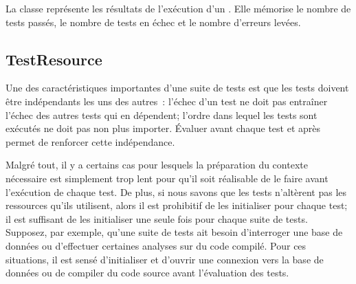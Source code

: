 \documentclass[a4paper,10pt,twoside]{book}
\begin{document}
La classe  représente les résultats de l'exécution d'un . Elle mémorise le nombre de tests passés, le nombre de tests en échec et le nombre d'erreurs levées.

\subsection{TestResource}
\label{sec:resource}

Une des caractéristiques importantes d'une suite de tests est que les tests doivent être indépendants les uns des autres~: l'échec d'un test ne doit pas entraîner l'échec des autres tests qui en dépendent; l'ordre dans lequel les tests sont exécutés ne doit pas non plus importer.
\'Evaluer   avant chaque test et  après permet de renforcer cette indépendance.

Malgré tout, il y a certains cas pour lesquels la préparation du contexte nécessaire est simplement trop lent pour qu'il soit 
réalisable
de le faire avant l'exécution de chaque test. De plus, si nous savons que les tests n'altèrent pas les ressources qu'ils utilisent, alors il est prohibitif de les initialiser pour chaque test; il est suffisant de les initialiser une seule fois pour chaque suite de tests. Supposez, par exemple, qu'une suite de tests ait besoin d'interroger une base de données ou d'effectuer certaines analyses sur du code compilé.
Pour ces situations, il est sensé d'initialiser et d'ouvrir une connexion vers la base de données ou de compiler du code source avant l'évaluation des tests.
\end{document}
